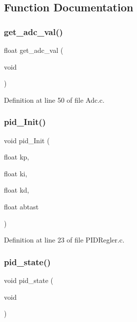 \subsection{Function Documentation}
\mbox{\label{_p_i_d_regler_8c_ad7adec982039e6bbf58fd9ac980cbce1}} 
\subsubsection{get\+\_\+adc\+\_\+val()}
{\footnotesize\ttfamily float get\+\_\+adc\+\_\+val (\begin{DoxyParamCaption}\item[{void}]{ }\end{DoxyParamCaption})}



Definition at line 50 of file Adc.\+c.

\mbox{\label{_p_i_d_regler_8c_a6eb065a52b581d2104b4c7cefb169469}} 
\subsubsection{pid\+\_\+\+Init()}
{\footnotesize\ttfamily void pid\+\_\+\+Init (\begin{DoxyParamCaption}\item[{float}]{kp,  }\item[{float}]{ki,  }\item[{float}]{kd,  }\item[{float}]{abtast }\end{DoxyParamCaption})}



Definition at line 23 of file P\+I\+D\+Regler.\+c.

\mbox{\label{_p_i_d_regler_8c_a589cb58e447b2b9be6c46a0bb648ac66}} 
\subsubsection{pid\+\_\+state()}
{\footnotesize\ttfamily void pid\+\_\+state (\begin{DoxyParamCaption}\item[{void}]{ }\end{DoxyParamCaption})}



